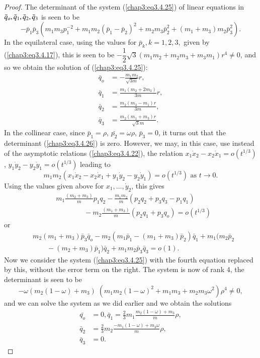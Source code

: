 \begin{proof}
The determinant of the system (\ref{chap3:eq3.4.25}) of linear
equations in $\bar{q}_o, \bar{q}_1,\break \bar{q}_2, \bar{q}_3$ is
seen to be 
\begin{equation*}
-\bar{p}_1 \bar{p}_3 (m_1 m_3 p_1^{-2} + m_1 m_2 (\bar{p}_1 -
\bar{p}_2)^2 + m_2 m_3 \bar{p}^2_2 + (m_1 + m_3) m_2
\bar{p}^2_3). \tag{3.4.26}\label{chap3:eq3.4.26} 
\end{equation*}
In the equilateral case, using the values for $\bar{p}_k, k = 1,2,3,$
given by (\ref{chap3:eq3.4.17}), this is seen to be $-\dfrac{1}{2}
\sqrt{3} (m_1 m_2 + m_2  m_3 + m_3 m_1) r^4 \neq 0$, and so we obtain
the solution of (\ref{chap3:eq3.4.25}): 
\begin{align*}
\bar{q}_o &= - \frac{m_1 m_2}{\sqrt{3m}} r,\\ 
\bar{q}_1 &= \frac{m_1(m_2 + 2m_3)}{3m} r,\\ 
\bar{q}_2 &= \frac{m_2(m_3 - m_1)r}{3m},\\ 
\bar{q}_3 &= \frac{m_2 (m_1+ m_3)r}{\sqrt{3}
  m}. \tag{3.4.27}\label{chap3:eq3.4.27} 
\end{align*}
In the collinear case, since $\bar{p}_1 = \rho$, $\bar{p_2} = \omega
\rho$, $\bar{p}_3 = 0$, it turns out that the\pageoriginale
determinant (\ref{chap3:eq3.4.26}) is zero. However, we may, in this
case, use instead of the asymptotic relations (\ref{chap3:eq3.4.22}),
the relation $x_1 \dot{x}_2 - x_2 \dot{x}_1 = o (t^{1/3})$, $y_1
\dot{y}_2 - y_2 \dot{y}_1 = o (t^{1/3})$ leading to  
\begin{equation*}
m_1 m_2 (x_1 \dot{x}_2  - x_2 \dot{x}_1 + y_1 \dot{y}_2 - y_2
\dot{y}_1) = o (t^{1/3}) \text{ as } t \to
0. \tag{3.4.28}\label{chap3:eq3.4.28} 
\end{equation*}
Using the values given above for $x_1 , \ldots, \dot{y}_2$, this gives 
\begin{align*}
&m_1 \frac{(m_2 + m_3)}{m} p_1 q_2 - \frac{m_1 m_2}{m} (p_2 q_2 + p_3
  q_3 - p_1 q_1)\\ 
&\qquad\qquad - m_2 \frac{(m_1 + m_3)}{m} (p_2 q_1 + p_3 q_o) = o (t^{1/3})
\end{align*}
or
\begin{align*}
& m_2(m_1 + m_3) \bar{p}_3 \bar{q}_o - m_2 (m_1 \bar{p}_1 - (m_1 + m_3)
\bar{p}_2) \bar{q}_1+ m_1 (m_2 \bar{p}_2\\ 
&\qquad - (m_2 + m_3) \bar{p}_1) \bar{q}_2  
+ m_1 m_2 \bar{p}_3 \bar{q}_3 = o(1).
\end{align*}
Now we consider the system (\ref{chap3:eq3.4.25}) with the fourth
equation replaced by this, without the error term on the right. The
system is now of rank 4, the determinant is seen to be 
$$
-\omega (m_2 (1-\omega) + m_3) \; (m_1m_2 (1-\omega)^2 + m_1 m_3 + m_2
m_3 \omega^2)\rho^4 \neq 0, 
$$
and we can solve the system as we did earlier and we obtain the
solutions 
\begin{align*}
\bar{q_o} &= 0, \bar{q}_1 = \frac{2}{3} m_1 \frac{m_2(1-\omega ) +
  m_3}{m} \rho,\\ 
\bar{q}_2 &= \frac{2}{3} m_2 \frac{-m_1 (1-\omega) + m_3
  \omega}{m}\rho,\\ 
\bar{q}_3 &= 0. \tag{3.4.29}\label{chap3:eq3.4.29}
\end{align*}


\end{proof}
